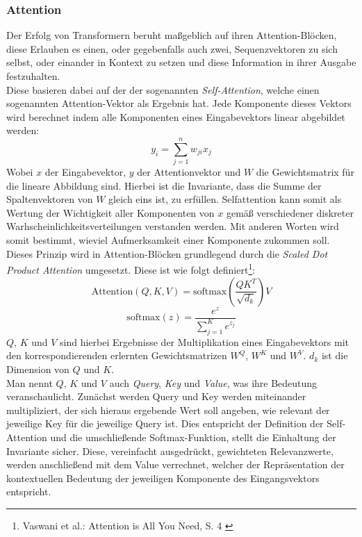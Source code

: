 \subsubsection{Attention}

Der Erfolg von Transformern beruht maßgeblich auf ihren Attention-Blöcken, diese Erlauben es einen, oder gegebenfalls auch zwei, Sequenzvektoren zu sich selbst, oder einander in Kontext zu setzen und diese Information in ihrer Ausgabe festzuhalten. \\
Diese basieren dabei auf der der sogenannten \textit{Self-Attention}, welche einen sogenannten Attention-Vektor als Ergebnis hat. Jede Komponente dieses Vektors wird berechnet indem alle Komponenten eines Eingabevektors linear abgebildet werden:
\begin{equation}
    y_i = \sum_{j=1}^n w_{ji}x_j
\end{equation}
Wobei $x$ der Eingabevektor, $y$ der Attentionvektor und $W$ die Gewichtsmatrix für die lineare Abbildung sind. Hierbei ist die Invariante, dass die Summe der Spaltenvektoren von $W$ gleich eins ist, zu erfüllen. Selfattention kann somit als Wertung der Wichtigkeit aller Komponenten von $x$ gemäß verschiedener diskreter Warhscheinlichkeitsverteilungen verstanden werden. Mit anderen Worten wird somit bestimmt, wieviel Aufmerksamkeit einer Komponente zukommen soll. \\
Dieses Prinzip wird in Attention-Blöcken grundlegend durch die \textit{Scaled Dot Product Attention} umgesetzt. Diese ist wie folgt definiert\footnote{
    Vaswani et al.: Attention is All You Need, S. 4
    \cite{vaswani2023attentionneed}
}:
\begin{equation}
    \text{Attention}(Q, K, V) = \text{softmax}
    \left (
        \frac {QK^T} {\sqrt{d_k}}
    \right ) V
\end{equation}
\begin{equation}
    \text{softmax}(z) = \frac{e^z}{\sum_{j=1}^K e^{z_j}}
\end{equation}
$Q$, $K$ und $V$ sind hierbei Ergebnisse der Multiplikation eines Eingabevektors mit den korrespondierenden erlernten Gewichtsmatrizen $W^Q$, $W^K$ und $W^V$. $d_k$ ist die Dimension von $Q$ und $K$. \\
Man nennt $Q$, $K$ und $V$ auch \textit{Query}, \textit{Key} und \textit{Value}, was ihre Bedeutung veranschaulicht. Zunächst werden Query und Key werden miteinander multipliziert, der sich hieraus ergebende Wert soll angeben, wie relevant der jeweilige Key für die jeweilige Query ist. Dies entspricht der Definition der Self-Attention und die umschließende Softmax-Funktion, stellt die Einhaltung der Invariante sicher. Diese, vereinfacht ausgedrückt, gewichteten Relevanzwerte, werden anschließend mit dem Value verrechnet, welcher der Repräsentation der kontextuellen Bedeutung der jeweiligen Komponente des Eingangsvektors entspricht. \\
